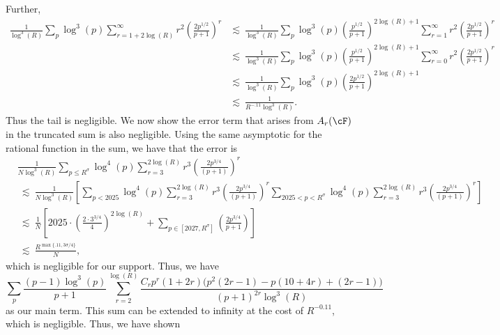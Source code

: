 \documentclass[11pt, reqno]{amsart}
\theoremstyle{definition}
\theoremstyle{remark}
\numberwithin{equation}{section}
\begin{document}
\normalsize
Further,
\begin{align}
     \frac{1}{\log^3(R)}\sum_p\log^3(p)\sum_{r=1+2\log(R)}^{\infty} r^2\left(\frac{2p^{1/2}}{p+1} \right)^r &\lesssim\ \frac{1}{\log^3(R)}\sum_p\log^3(p)\left(\frac{p^{1/2}}{p+1} \right)^{2\log(R)+1}\sum_{r=1}^{\infty} r^2\left(\frac{2p^{1/2}}{p+1} \right)^r\nonumber\\ 
     &\lesssim\ \frac{1}{\log^3(R)}\sum_p\log^3(p)\left(\frac{p^{1/2}}{p+1} \right)^{2\log(R)+1}\sum_{r=0}^{\infty} r^2\left(\frac{2p^{1/2}}{p+1} \right)^r\nonumber\\
      &\lesssim\ \frac{1}{\log^3(R)}\sum_p\log^3(p)\left(\frac{2p^{1/2}}{p+1} \right)^{2\log(R)+1}\nonumber\\
      &\lesssim\ \frac{1}{R^{-.11}\log^3(R)}.
\end{align}
Thus the tail is negligible. We now show the error term that arises from $A_r(\cF)$ in the truncated sum is also negligible. Using the same asymptotic for the rational function in the sum, we have that the error is 
\begin{align*}
     &\frac{1}{N\log^3(R)}\sum_{p\leq R^{\sigma}}\log^4(p)\sum_{r=3}^{2\log(R)}r^3\left(\frac{2p^{3/4}}{(p+1)}\right)^r \\
     &\ \lesssim\ \frac{1}{N\log^3(R)}\left[\sum_{p< 2025}\log^4(p)\sum_{r=3}^{2\log(R)}r^3\left(\frac{2p^{3/4}}{(p+1)}\right)^r \sum_{2025<p< R^{\sigma}}\log^4(p)\sum_{r=3}^{2\log(R)}r^3\left(\frac{2p^{3/4}}{(p+1)}\right)^r \right]\\
     &\ \lesssim\ \frac{1}{N}\left[2025\cdot \left(\frac{2\cdot3^{3/4}}{4}\right)^{2\log(R)} + \sum_{p\in[2027,R^{\sigma}]}\left(\frac{2p^{3/4}}{p+1} \right) \right]  \\
     &\ \lesssim\ \frac{R^{\max\{.11,3\sigma/4\}}}{N},
\end{align*}\normalsize
which is negligible for our support. Thus, we have 
    \begin{equation}
    \sum_p\frac{(p-1)\log^3(p)}{p+1}\sum_{r=2}^{\log(R)}\frac{C_r p^{r}(1 + 2r)\bigl(p^{2}(2r - 1) - p (10 + 4 r) + (2r - 1)\bigr)}{(p+1)^{2r}\log^3(R)}
\end{equation}
as our main term. This sum can be extended to infinity at the cost of $R^{-0.11}$, which is negligible. Thus, we have shown
\end{document}
